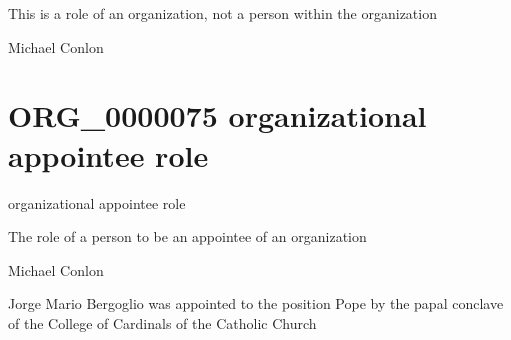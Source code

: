 \documentclass[letterpaper,10pt,english]{sphinxmanual}
\begin{document}
\begin{sphinxShadowBox}

\sphinxAtStartPar
This is a role of an organization, not a person within the organization
\end{sphinxShadowBox}

\begin{sphinxShadowBox}

\sphinxAtStartPar
Michael Conlon 
\end{sphinxShadowBox}
\begin{quote}
\label{\detokenize{doc-ORG_0000075:org-0000075}}\label{\detokenize{doc-ORG_0000075:organizational-appointee-role}}\label{\detokenize{doc-ORG_0000075:org-0000075}}
\ignorespaces \end{quote}


\section{ORG\_0000075 \sphinxhyphen{} organizational appointee role}
\label{\detokenize{doc-ORG_0000075:org-0000075-organizational-appointee-role}}\label{\detokenize{doc-ORG_0000075:index-0}}\label{\detokenize{doc-ORG_0000075::doc}}
\begin{sphinxShadowBox}

\sphinxAtStartPar
organizational appointee role
\end{sphinxShadowBox}

\begin{sphinxShadowBox}

\sphinxAtStartPar
The role of a person to be an appointee of an organization
\end{sphinxShadowBox}

\begin{sphinxShadowBox}

\sphinxAtStartPar
Michael Conlon 
\end{sphinxShadowBox}

\begin{sphinxShadowBox}

\sphinxAtStartPar
Jorge Mario Bergoglio was appointed to the position Pope by the papal conclave of the College of Cardinals of the Catholic Church
\end{sphinxShadowBox}
\end{document}
